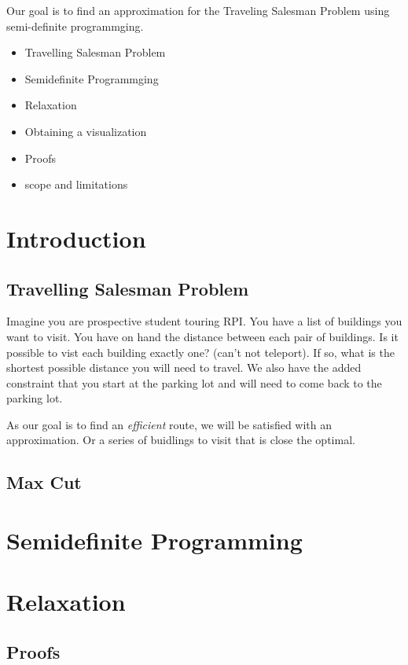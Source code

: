 \documentclass{article}
\begin{document}
Our goal is to find an approximation for the Traveling Salesman Problem using semi-definite programmging.

\begin{itemize}
\item Travelling Salesman Problem
\item Semidefinite Programmging
\item Relaxation
\item Obtaining a visualization
\item Proofs
\item scope and limitations
\end{itemize}

\section{Introduction}

\subsection{Travelling Salesman Problem}
Imagine you are prospective student touring RPI. You have a list of buildings you want to visit.
You have on hand the distance between each pair of buildings. Is it possible to vist each building exactly one?
(can't not teleport). If so, what is the shortest possible distance you will need to travel. We also 
have the added constraint that you start at the parking lot and will need to come back to the parking lot.

As our goal is to find an \emph{efficient} route, we will be satisfied with an approximation. 
Or a series of buidlings to visit that is close the optimal.

\subsection{Max Cut}

\section{Semidefinite Programming}

\section{Relaxation}

\subsection{Proofs}
\end{document}
